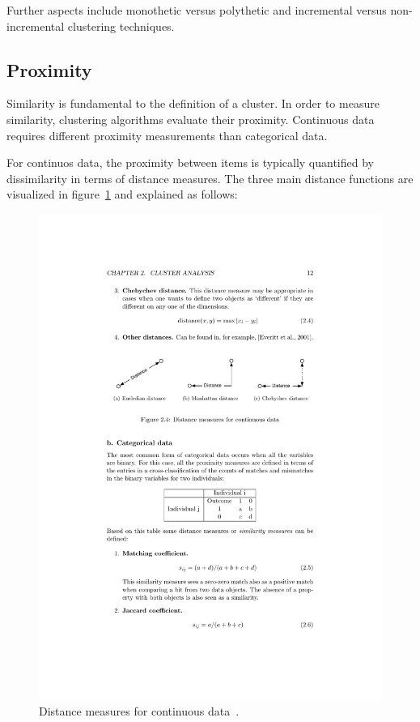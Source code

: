 Further aspects include monothetic versus polythetic and incremental versus non-incremental clustering techniques. 



\subsection{Proximity}
\label{chapter:proximity}

Similarity is fundamental to the definition of a cluster. In order to measure similarity, clustering algorithms evaluate their proximity. Continuous data requires different proximity measurements than categorical data.

For continuos data, the proximity between items is typically quantified by dissimilarity in terms of distance measures. The three main distance functions are visualized in figure~\ref{fig:clustering-proximity} and explained as follows\cite{Meert06clustermaps}:

\begin{figure}[h]
  \begin{center}
    \includegraphics[width=1\textwidth]{figures/clustering_proximity.pdf}
    \caption{Distance measures for continuous data~\cite[p 12]{Meert06clustermaps}.}
    \label{fig:clustering-proximity}
  \end{center}
\end{figure}

